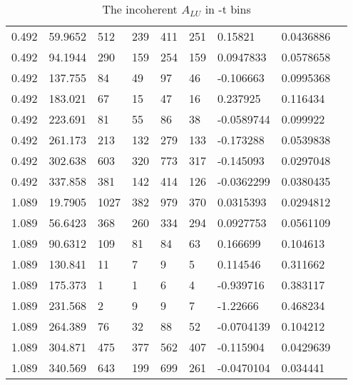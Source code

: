 \documentclass[12pt]{article}
\begin{document}
\begin{table}[!h]
\begin{center}
\begin{tabular}{||l|l|l|l|l|l|l|l|l||}
0.492    &59.9652  &512    &239   &411   &251    &0.15821    &0.0436886\\
0.492    &94.1944  &290    &159   &254   &159    &0.0947833    &0.0578658\\
0.492    &137.755  &84    &49   &97   &46    &-0.106663    &0.0995368\\
0.492    &183.021 &67    &15   &47   &16    &0.237925    &0.116434\\
0.492    &223.691  &81    &55   &86   &38    &-0.0589744    &0.099922\\
0.492    &261.173   &213    &132   &279   &133    &-0.173288    &0.0539838\\
0.492    &302.638   &603    &320   &773   &317    &-0.145093    &0.0297048\\
0.492    &337.858   &381    &142   &414   &126    &-0.0362299    &0.0380435\\
\hline
1.089    &19.7905  &1027    &382   &979   &370    &0.0315393    &0.0294812\\
1.089    &56.6423  &368    &260   &334   &294    &0.0927753    &0.0561109\\
1.089    &90.6312  &109    &81   &84   &63    &0.166699    &0.104613\\
1.089    &130.841  &11    &7   &9   &5    &0.114546    &0.311662\\
1.089    &175.373  &1    &1   &6   &4    &-0.939716    &0.383117\\
1.089    &231.568 &2    &9   &9   &7    &-1.22666    &0.468234\\
1.089    &264.389  &76    &32   &88   &52    &-0.0704139    &0.104212\\
1.089    &304.871  &475    &377   &562   &407    &-0.115904    &0.0429639\\
1.089    &340.569 &643    &199   &699   &261    &-0.0470104    &0.034441\\


 \hline
 \hline
 \end{tabular}
 \caption{The incoherent $A_{LU}$ in -t bins}
 \label{table:InCoh_t_BSA}
 \end{center}
\end{table}
\end{document}
